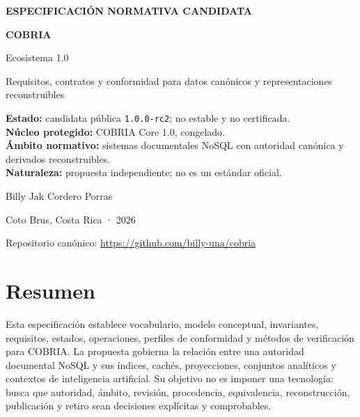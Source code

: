 \documentclass[11pt,letterpaper]{article}
\begin{document}
\begin{titlepage}
\pagecolor{papel}\color{tinta}\vspace*{1.2cm}
{\color{coral}\bfseries\large ESPECIFICACIÓN NORMATIVA CANDIDATA\par}\vspace{1cm}
{\color{bosqueoscuro}\bfseries\fontsize{34}{39}\selectfont COBRIA\par}\vspace{.3cm}
{\color{bosque}\fontsize{21}{26}\selectfont Ecosistema 1.0\par}\vspace{.7cm}
{\Large Requisitos, contratos y conformidad para datos canónicos y representaciones reconstruibles\par}
\vspace{1cm}
\begin{tcolorbox}[colback=white,colframe=jade,arc=2mm,boxrule=.8pt]
\textbf{Estado:} candidata pública \texttt{1.0.0-rc2}; no estable y no certificada.\\
\textbf{Núcleo protegido:} COBRIA Core 1.0, congelado.\\
\textbf{Ámbito normativo:} sistemas documentales NoSQL con autoridad canónica y derivados reconstruibles.\\
\textbf{Naturaleza:} propuesta independiente; no es un estándar oficial.
\end{tcolorbox}
\vfill
{\large Billy Jak Cordero Porras\par}
{Coto Brus, Costa Rica · 2026\par}\vspace{.6cm}
{\small Repositorio canónico: \url{https://github.com/billy-una/cobria}\par}
\end{titlepage}
\nopagecolor
{}

\section*{Resumen}
Esta especificación establece vocabulario, modelo conceptual, invariantes, requisitos,
estados, operaciones, perfiles de conformidad y métodos de verificación para COBRIA. La
propuesta gobierna la relación entre una autoridad documental NoSQL y sus índices,
cachés, proyecciones, conjuntos analíticos y contextos de inteligencia artificial. Su
objetivo no es imponer una tecnología: busca que autoridad, ámbito, revisión,
procedencia, equivalencia, reconstrucción, publicación y retiro sean decisiones
explícitas y comprobables.
\end{document}
